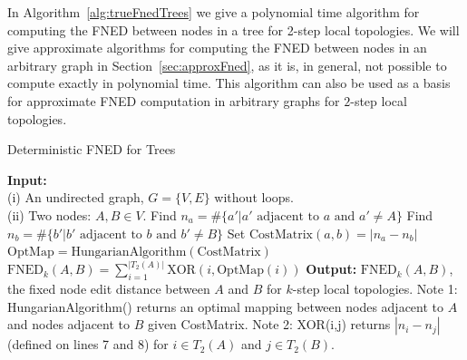 \documentclass{article}
\begin{document}
In Algorithm~\ref{alg:trueFnedTrees} we give a polynomial time algorithm for computing the FNED between nodes in a tree for 2-step local topologies. We will give approximate algorithms for computing the FNED between nodes in an arbitrary graph in Section~\ref{sec:approxFned}, as it is, in general, not possible to compute exactly in polynomial time. This algorithm can also be used as a basis for approximate FNED computation in arbitrary graphs for $2$-step local topologies.
\begin{algorithm}[h!tbp]
\caption{Deterministic FNED for Trees}
\label{alg:trueFnedTrees}
\begin{algorithmic}[1]
\STATE \textbf{Input:} \\(i) An undirected graph, $G = \{V,E\}$ without loops.\\(ii) Two nodes: $A, B \in V$.
\STATE Find $n_{a} = \# \{ a' | a' \text{ adjacent to } a \text{ and } a' \neq A \}$
\STATE Find $n_{b} = \# \{ b' | b' \text{ adjacent to } b \text{ and } b' \neq B \}$
\STATE Set $\text{CostMatrix}(a,b) = | n_{a} - n_{b} |$
\ENDFOR
\ENDFOR
\STATE $\text{OptMap}=\text{HungarianAlgorithm}(\text{CostMatrix})$
\STATE $\text{FNED}_{k}(A,B) = \sum_{i=1}^{|T_{2}(A)|} \text{XOR}(i,\text{OptMap}(i))$
\STATE \textbf{Output:} $\text{FNED}_{k}(A,B)$, the fixed node edit distance between $A$ and $B$ for $k$-step local topologies.
\STATE Note 1: HungarianAlgorithm() returns an optimal mapping between nodes adjacent to $A$ and nodes adjacent to $B$ given CostMatrix.
\STATE Note 2: XOR(i,j) returns $|n_{i} - n_{j}|$ (defined on lines 7 and 8) for $i \in T_{2}(A)$ and $j \in T_{2}(B)$.
\end{algorithmic}
\end{algorithm}
\end{document}

